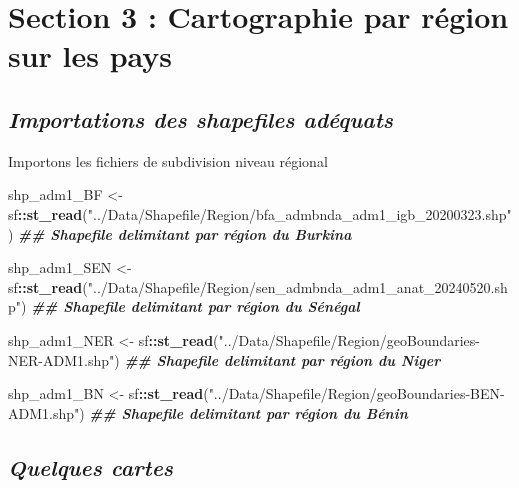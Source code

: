 \documentclass[
]{article}
\newenvironment{Shaded}{\begin{snugshade}}{\end{snugshade}}
\newcommand{\DocumentationTok}[1]{\textcolor[rgb]{0.56,0.35,0.01}{\textbf{\textit{#1}}}}
\newcommand{\FunctionTok}[1]{\textcolor[rgb]{0.13,0.29,0.53}{\textbf{#1}}}
\newcommand{\NormalTok}[1]{#1}
\newcommand{\OtherTok}[1]{\textcolor[rgb]{0.56,0.35,0.01}{#1}}
\newcommand{\SpecialCharTok}[1]{\textcolor[rgb]{0.81,0.36,0.00}{\textbf{#1}}}
\newcommand{\StringTok}[1]{\textcolor[rgb]{0.31,0.60,0.02}{#1}}
\begin{document}
\newpage

\section{\texorpdfstring{\textbf{Section 3 : Cartographie par région sur
les
pays}}{Section 3 : Cartographie par région sur les pays}}\label{section-3-cartographie-par-ruxe9gion-sur-les-pays}

\subsection{\texorpdfstring{\emph{Importations des shapefiles
adéquats}}{Importations des shapefiles adéquats}}\label{importations-des-shapefiles-aduxe9quats}

Importons les fichiers de subdivision niveau régional

\begin{Shaded}
\begin{Highlighting}[]
\NormalTok{shp\_adm1\_BF }\OtherTok{\textless{}{-}}\NormalTok{ sf}\SpecialCharTok{::}\FunctionTok{st\_read}\NormalTok{(}\StringTok{"../Data/Shapefile/Region/bfa\_admbnda\_adm1\_igb\_20200323.shp"}\NormalTok{) }\DocumentationTok{\#\# Shapefile delimitant par région du Burkina}

\NormalTok{shp\_adm1\_SEN }\OtherTok{\textless{}{-}}\NormalTok{ sf}\SpecialCharTok{::}\FunctionTok{st\_read}\NormalTok{(}\StringTok{"../Data/Shapefile/Region/sen\_admbnda\_adm1\_anat\_20240520.shp"}\NormalTok{) }\DocumentationTok{\#\# Shapefile delimitant par région du Sénégal}

\NormalTok{shp\_adm1\_NER }\OtherTok{\textless{}{-}}\NormalTok{ sf}\SpecialCharTok{::}\FunctionTok{st\_read}\NormalTok{(}\StringTok{"../Data/Shapefile/Region/geoBoundaries{-}NER{-}ADM1.shp"}\NormalTok{) }\DocumentationTok{\#\# Shapefile delimitant par région du Niger}

\NormalTok{shp\_adm1\_BN }\OtherTok{\textless{}{-}}\NormalTok{ sf}\SpecialCharTok{::}\FunctionTok{st\_read}\NormalTok{(}\StringTok{"../Data/Shapefile/Region/geoBoundaries{-}BEN{-}ADM1.shp"}\NormalTok{) }\DocumentationTok{\#\# Shapefile delimitant par région du Bénin}
\end{Highlighting}
\end{Shaded}

\subsection{\texorpdfstring{\emph{Quelques
cartes}}{Quelques cartes}}\label{quelques-cartes}
\end{document}

